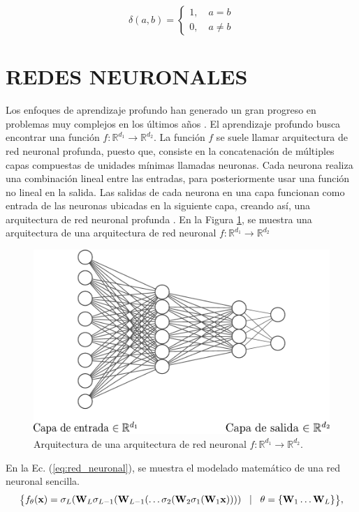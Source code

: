\begin{equation}
    \delta(a,b) = \begin{cases}
        1, \quad a = b \\
        0, \quad a \neq b
    \end{cases}
\end{equation}
\section{REDES NEURONALES}

Los enfoques de aprendizaje profundo han generado un gran progreso en problemas muy complejos en los últimos años
. El aprendizaje profundo busca encontrar una función $f: \mathbb{R}^{d_1} \rightarrow \mathbb{R}^{d_2}$. La función $f$ se suele llamar arquitectura de red neuronal profunda, puesto que, consiste en la concatenación de múltiples capas compuestas de unidades mínimas llamadas neuronas. Cada neurona realiza una combinación lineal entre las entradas, para posteriormente usar una función no lineal en la salida. Las salidas de cada neurona en una capa funcionan como entrada de las neuronas ubicadas en la siguiente capa, creando así, una arquitectura de red neuronal profunda . En la Figura \ref{fig:nn}, se muestra una arquitectura de una arquitectura de red neuronal $f: \mathbb{R}^{d_1} \rightarrow \mathbb{R}^{d_2}$

\begin{figure}[H]
    \centering
    \includegraphics[width=0.6\linewidth]{images/nn.pdf}
    \caption{\hspace{2mm}Arquitectura de una arquitectura de red neuronal $f: \mathbb{R}^{d_1} \rightarrow \mathbb{R}^{d_2}$.}
    \label{fig:nn}
\end{figure}

En la Ec. (\ref{eq:red_neuronal}), se muestra el modelado matemático de una red neuronal sencilla. 
\begin{equation}
    \footnotesize 
    \big\{f_\theta(\mathbf{x}) = \sigma_{L}(\mathbf{W}_{L}\sigma_{L-1}(\mathbf{W}_{L-1} (\dots \sigma_2(\mathbf{W}_2\sigma_1(\mathbf{W}_1\mathbf{x})))) \quad \vert \quad\theta = \{\mathbf{W}_{1} \dots \mathbf{W}_{L}\}  \big\},
    \label{eq:red_neuronal}
\end{equation}

